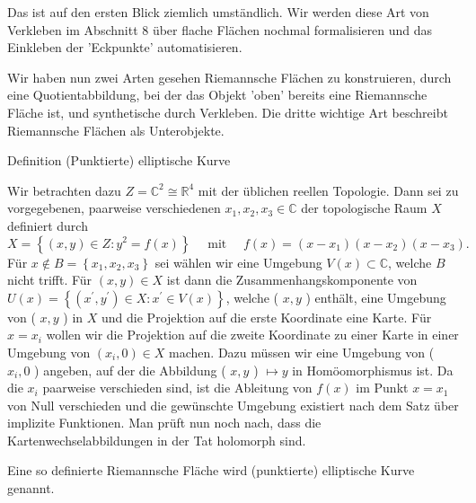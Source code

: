 \documentclass[10pt, letterpaper]{article}
\begin{document}
Das ist auf den ersten Blick ziemlich umständlich. Wir werden diese Art von Verkleben im Abschnitt 8 über flache Flächen nochmal formalisieren und das Einkleben der 'Eckpunkte' automatisieren.

Wir haben nun zwei Arten gesehen Riemannsche Flächen zu konstruieren, durch eine Quotientabbildung, bei der das Objekt 'oben' bereits eine Riemannsche Fläche ist, und synthetische durch Verkleben. Die dritte wichtige Art beschreibt Riemannsche Flächen als Unterobjekte.


Definition (Punktierte) elliptische Kurve 

Wir betrachten dazu $Z=\mathbb{C}^{2} \cong \mathbb{R}^{4}$ mit der üblichen reellen Topologie. Dann sei zu vorgegebenen, paarweise verschiedenen $x_{1}, x_{2}, x_{3} \in \mathbb{C}$ der topologische Raum $X$ definiert durch
$$
X=\left\{(x, y) \in Z: y^{2}=f(x)\right\} \quad \text { mit } \quad f(x)=\left(x-x_{1}\right)\left(x-x_{2}\right)\left(x-x_{3}\right) .
$$
Für $x \notin B=\left\{x_{1}, x_{2}, x_{3}\right\}$ sei wählen wir eine Umgebung $V(x) \subset \mathbb{C}$, welche $B$ nicht trifft. Für $(x, y) \in X$ ist dann die Zusammenhangskomponente von $U(x)=\left\{\left(x^{\prime}, y^{\prime}\right) \in X: x^{\prime} \in V(x)\right\}$, welche ( $x, y$ ) enthält, eine Umgebung von ( $x, y$ ) in $X$ und die Projektion auf die erste Koordinate eine Karte. Für $x=x_{i}$ wollen wir die Projektion auf die zweite Koordinate zu einer Karte in einer Umgebung von $\left(x_{i}, 0\right) \in X$ machen. Dazu müssen wir eine Umgebung von ( $x_{i}, 0$ ) angeben, auf der die Abbildung ( $x, y$ ) $\mapsto y$ in Homöomorphismus ist. Da die $x_{i}$ paarweise verschieden sind, ist die Ableitung von $f(x)$ im Punkt $x=x_{1}$ von Null verschieden und die gewünschte Umgebung existiert nach dem Satz über implizite Funktionen. Man prüft nun noch nach, dass die Kartenwechselabbildungen in der Tat holomorph sind.

Eine so definierte Riemannsche Fläche wird (punktierte) elliptische Kurve genannt.
\end{document}
